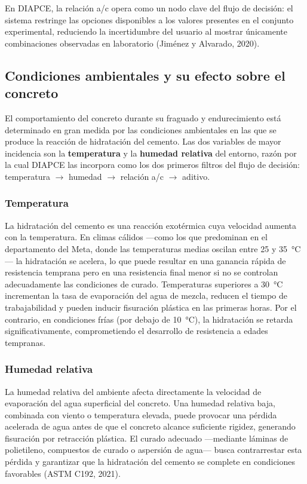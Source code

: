 En DIAPCE, la relación a/c opera como un nodo clave del flujo de decisión: el sistema restringe las opciones disponibles a los valores presentes en el conjunto experimental, reduciendo la incertidumbre del usuario al mostrar únicamente combinaciones observadas en laboratorio (Jiménez y Alvarado, 2020).

\subsection{Condiciones ambientales y su efecto sobre el concreto}

El comportamiento del concreto durante su fraguado y endurecimiento está determinado en gran medida por las condiciones ambientales en las que se produce la reacción de hidratación del cemento. Las dos variables de mayor incidencia son la \textbf{temperatura} y la \textbf{humedad relativa} del entorno, razón por la cual DIAPCE las incorpora como los dos primeros filtros del flujo de decisión: temperatura $\rightarrow$ humedad $\rightarrow$ relación a/c $\rightarrow$ aditivo.

\subsubsection*{Temperatura}

La hidratación del cemento es una reacción exotérmica cuya velocidad aumenta con la temperatura. En climas cálidos ---como los que predominan en el departamento del Meta, donde las temperaturas medias oscilan entre 25 y 35~°C--- la hidratación se acelera, lo que puede resultar en una ganancia rápida de resistencia temprana pero en una resistencia final menor si no se controlan adecuadamente las condiciones de curado. Temperaturas superiores a 30~°C incrementan la tasa de evaporación del agua de mezcla, reducen el tiempo de trabajabilidad y pueden inducir fisuración plástica en las primeras horas. Por el contrario, en condiciones frías (por debajo de 10~°C), la hidratación se retarda significativamente, comprometiendo el desarrollo de resistencia a edades tempranas.

\subsubsection*{Humedad relativa}

La humedad relativa del ambiente afecta directamente la velocidad de evaporación del agua superficial del concreto. Una humedad relativa baja, combinada con viento o temperatura elevada, puede provocar una pérdida acelerada de agua antes de que el concreto alcance suficiente rigidez, generando fisuración por retracción plástica. El curado adecuado ---mediante láminas de polietileno, compuestos de curado o aspersión de agua--- busca contrarrestar esta pérdida y garantizar que la hidratación del cemento se complete en condiciones favorables (ASTM C192, 2021).

